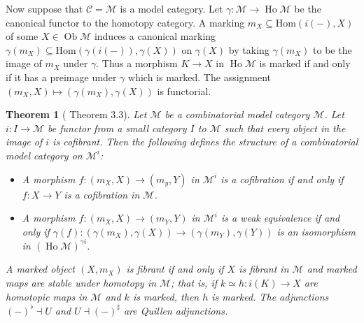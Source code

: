 \documentclass{article}
\newtheorem{theorem}{Theorem}
\theoremstyle{remark}
\theoremstyle{definition}
\begin{document}
Now suppose that $\mathcal{C} = \mathcal{M}$ is a model category.
Let $\gamma : \mathcal{M} \rightarrow \operatorname{Ho} \mathcal{M}$ be the canonical functor to the homotopy category.
A marking $m_X \subseteq \mathrm{Hom}(i(-), X)$ of some $X \in \operatorname{Ob} \mathcal{M}$ induces a canonical marking $\gamma(m_X) \subseteq \mathrm{Hom}(\gamma(i(-)), \gamma(X))$ on $\gamma(X)$ by taking $\gamma(m_X)$ to be the image of $m_X$ under $\gamma$.
Thus a morphism $K \rightarrow X$ in $\operatorname{Ho} \mathcal{M}$ is marked if and only if it has a preimage under $\gamma$ which is marked.
The assignment $(m_X, X) \mapsto (\gamma(m_X), \gamma(X))$ is functorial.

\begin{theorem}[\cite{marked-objects} Theorem 3.3]
  \label{th:marked-model-category}
  Let $\mathcal{M}$ be a combinatorial model category $\mathcal{M}$.
  Let $i : I \rightarrow \mathcal{M}$ be functor from a small category $I$ to $\mathcal{M}$ such that every object in the image of $i$ is cofibrant.
  Then the following defines the structure of a combinatorial model category on $\mathcal{M}^i$:
  \begin{itemize}
    \item
      A morphism $f : (m_X, X) \rightarrow (m_y, Y)$ in $\mathcal{M}^i$ is a cofibration if and only if $f : X \rightarrow Y$ is a cofibration in $\mathcal{M}$.
    \item
      A morphism $f : (m_X, X) \rightarrow (m_Y, Y)$ in $\mathcal{M}^i$ is a weak equivalence if and only if $\gamma(f) : (\gamma(m_X), \gamma(X)) \rightarrow (\gamma(m_Y), \gamma(Y))$ is an isomorphism in $(\operatorname{Ho} \mathcal{M})^{\gamma i}$.
  \end{itemize}
  A marked object $(X, m_X)$ is fibrant if and only if $X$ is fibrant in $\mathcal{M}$ and marked maps are stable under homotopy in $\mathcal{M}$; that is, if $k \simeq h : i(K) \rightarrow X$ are homotopic maps in $\mathcal{M}$ and $k$ is marked, then $h$ is marked.
  The adjunctions $(-)^\flat \dashv U$ and $U \dashv (-)^\sharp$ are Quillen adjunctions.
\end{theorem}
\end{document}
